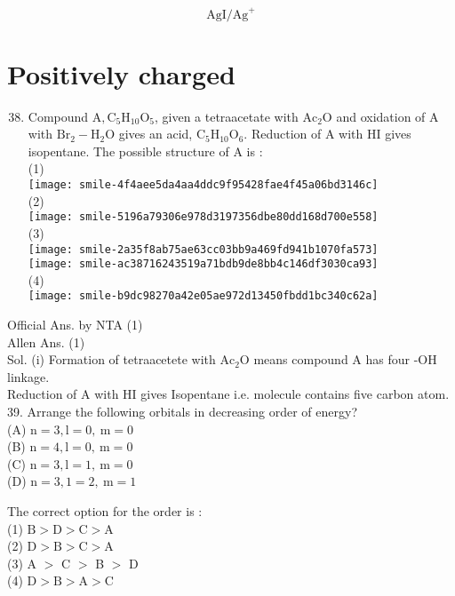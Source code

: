 \documentclass[10pt]{article}
\begin{document}
\[
\mathrm{AgI} / \mathrm{Ag}^{+}
\]

\section*{Positively charged}
\begin{enumerate}
  \setcounter{enumi}{37}
  \item Compound \(\mathrm{A}, \mathrm{C}_{5} \mathrm{H}_{10} \mathrm{O}_{5}\), given a tetraacetate with \(\mathrm{Ac}_{2} \mathrm{O}\) and oxidation of A with \(\mathrm{Br}_{2}-\mathrm{H}_{2} \mathrm{O}\) gives an acid, \(\mathrm{C}_{5} \mathrm{H}_{10} \mathrm{O}_{6}\). Reduction of A with HI gives isopentane. The possible structure of A is :\\
(1)\\
\texttt{[image: smile-4f4aee5da4aa4ddc9f95428fae4f45a06bd3146c]}\\
(2)\\
\texttt{[image: smile-5196a79306e978d3197356dbe80dd168d700e558]}\\
(3)\\
\texttt{[image: smile-2a35f8ab75ae63cc03bb9a469fd941b1070fa573]}\\
\texttt{[image: smile-ac38716243519a71bdb9de8bb4c146df3030ca93]}\\
(4)\\
\texttt{[image: smile-b9dc98270a42e05ae972d13450fbdd1bc340c62a]}
\end{enumerate}

Official Ans. by NTA (1)\\
Allen Ans. (1)\\
Sol. (i) Formation of tetraacetete with \(\mathrm{Ac}_{2} \mathrm{O}\) means compound A has four -OH linkage.\\
Reduction of A with HI gives Isopentane i.e. molecule contains five carbon atom.\\
39. Arrange the following orbitals in decreasing order of energy?\\
(A) \(\mathrm{n}=3, \mathrm{l}=0, \mathrm{~m}=0\)\\
(B) \(\mathrm{n}=4, \mathrm{l}=0, \mathrm{~m}=0\)\\
(C) \(\mathrm{n}=3, \mathrm{l}=1, \mathrm{~m}=0\)\\
(D) \(\mathrm{n}=3,1=2, \mathrm{~m}=1\)

The correct option for the order is :\\
(1) \(\mathrm{B}>\mathrm{D}>\mathrm{C}>\mathrm{A}\)\\
(2) \(\mathrm{D}>\mathrm{B}>\mathrm{C}>\mathrm{A}\)\\
(3) A \(>\) C \(>\) B \(>\) D\\
(4) \(\mathrm{D}>\mathrm{B}>\mathrm{A}>\mathrm{C}\)
\end{document}
